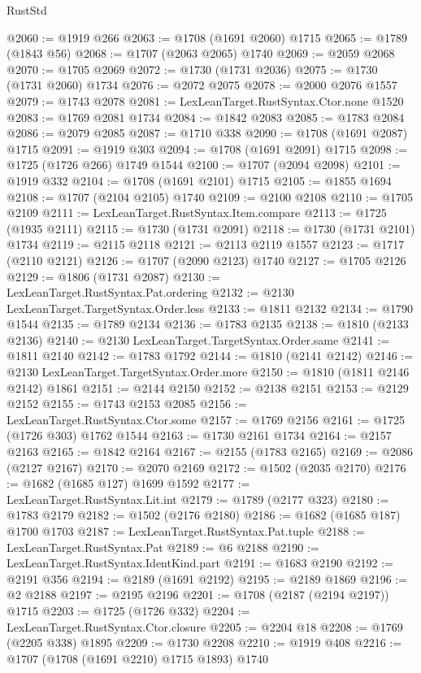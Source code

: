 \begin{lexlean}{RustStd}
\begin{coremodule}
@2060 := @1919 @266
@2063 := @1708 (@1691 @2060) @1715
@2065 := @1789 (@1843 @56)
@2068 := @1707 (@2063 @2065) @1740
@2069 := @2059 @2068
@2070 := @1705 @2069
@2072 := @1730 (@1731 @2036)
@2075 := @1730 (@1731 @2060) @1734
@2076 := @2072 @2075
@2078 := @2000 @2076 @1557
@2079 := @1743 @2078
@2081 := LexLeanTarget.RustSyntax.Ctor.none @1520
@2083 := @1769 @2081 @1734
@2084 := @1842 @2083
@2085 := @1783 @2084
@2086 := @2079 @2085
@2087 := @1710 @338
@2090 := @1708 (@1691 @2087) @1715
@2091 := @1919 @303
@2094 := @1708 (@1691 @2091) @1715
@2098 := @1725 (@1726 @266) @1749 @1544
@2100 := @1707 (@2094 @2098)
@2101 := @1919 @332
@2104 := @1708 (@1691 @2101) @1715
@2105 := @1855 @1694
@2108 := @1707 (@2104 @2105) @1740
@2109 := @2100 @2108
@2110 := @1705 @2109
@2111 := LexLeanTarget.RustSyntax.Item.compare
@2113 := @1725 (@1935 @2111)
@2115 := @1730 (@1731 @2091)
@2118 := @1730 (@1731 @2101) @1734
@2119 := @2115 @2118
@2121 := @2113 @2119 @1557
@2123 := @1717 (@2110 @2121)
@2126 := @1707 (@2090 @2123) @1740
@2127 := @1705 @2126
@2129 := @1806 (@1731 @2087)
@2130 := LexLeanTarget.RustSyntax.Pat.ordering
@2132 := @2130 LexLeanTarget.TargetSyntax.Order.less
@2133 := @1811 @2132
@2134 := @1790 @1544
@2135 := @1789 @2134
@2136 := @1783 @2135
@2138 := @1810 (@2133 @2136)
@2140 := @2130 LexLeanTarget.TargetSyntax.Order.same
@2141 := @1811 @2140
@2142 := @1783 @1792
@2144 := @1810 (@2141 @2142)
@2146 := @2130 LexLeanTarget.TargetSyntax.Order.more
@2150 := @1810 (@1811 @2146 @2142) @1861
@2151 := @2144 @2150
@2152 := @2138 @2151
@2153 := @2129 @2152
@2155 := @1743 @2153 @2085
@2156 := LexLeanTarget.RustSyntax.Ctor.some
@2157 := @1769 @2156
@2161 := @1725 (@1726 @303) @1762 @1544
@2163 := @1730 @2161 @1734
@2164 := @2157 @2163
@2165 := @1842 @2164
@2167 := @2155 (@1783 @2165)
@2169 := @2086 (@2127 @2167)
@2170 := @2070 @2169
@2172 := @1502 (@2035 @2170)
@2176 := @1682 (@1685 @127) @1699 @1592
@2177 := LexLeanTarget.RustSyntax.Lit.int
@2179 := @1789 (@2177 @323)
@2180 := @1783 @2179
@2182 := @1502 (@2176 @2180)
@2186 := @1682 (@1685 @187) @1700 @1703
@2187 := LexLeanTarget.RustSyntax.Pat.tuple
@2188 := LexLeanTarget.RustSyntax.Pat
@2189 := @6 @2188
@2190 := LexLeanTarget.RustSyntax.IdentKind.part
@2191 := @1683 @2190
@2192 := @2191 @356
@2194 := @2189 (@1691 @2192)
@2195 := @2189 @1869
@2196 := @2 @2188
@2197 := @2195 @2196
@2201 := @1708 (@2187 (@2194 @2197)) @1715
@2203 := @1725 (@1726 @332)
@2204 := LexLeanTarget.RustSyntax.Ctor.closure
@2205 := @2204 @18
@2208 := @1769 (@2205 @338) @1895
@2209 := @1730 @2208
@2210 := @1919 @408
@2216 := @1707 (@1708 (@1691 @2210) @1715 @1893) @1740

\end{coremodule}
\end{lexlean}
